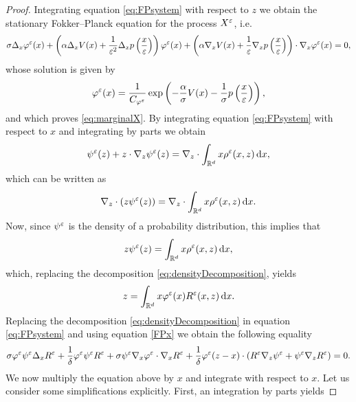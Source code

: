\documentclass[10pt]{article}
\begin{document}
\begin{proof} Integrating equation \eqref{eq:FPsystem} with respect to $z$ we obtain the stationary Fokker--Planck equation for the process $X^\varepsilon$, i.e.
\begin{equation}
\label{FPx}
\sigma \Delta_x \varphi^\varepsilon(x) + \left ( \alpha \Delta_x V(x) + \frac1{\varepsilon^2} \Delta_x p \left( \frac{x}{\varepsilon} \right) \right) \varphi^\varepsilon(x) + \left ( \alpha \nabla_xV(x) + \frac{1}{\varepsilon} \nabla_xp \left ( \frac{x}{\varepsilon} \right ) \right ) \cdot \nabla_x\varphi^\varepsilon(x) = 0,
\end{equation}
whose solution is given by
\begin{equation}
\varphi^\varepsilon(x) = \frac{1}{C_{\varphi^\varepsilon}} \exp\left(- \frac{\alpha}{\sigma} V(x) - \frac{1}{\sigma} p \left ( \frac{x}{\varepsilon} \right )\right),
\end{equation}
and which proves \eqref{eq:marginalX}. By integrating equation \eqref{eq:FPsystem} with respect to $x$ and integrating by parts we obtain
\begin{equation}
\psi^\varepsilon(z) + z \cdot \nabla_z \psi^\varepsilon(z) = \nabla_z \cdot \int_{\mathbb{R}^d} x \rho^\varepsilon(x,z) \,\mathrm{d} x,
\end{equation}
which can be written as
\begin{equation}
	\nabla_z \cdot (z \psi^\varepsilon(z)) = \nabla_z \cdot \int_{\mathbb{R}^d} x \rho^\varepsilon(x,z) \,\mathrm{d} x.
\end{equation}
Now, since $\psi^\varepsilon$ is the density of a probability distribution, this implies that 
\begin{equation}\label{FPz}
z \psi^\varepsilon(z) = \int_{\mathbb{R}^d} x \rho^\varepsilon(x,z) \,\mathrm{d} x,
\end{equation}
which, replacing the decomposition \eqref{eq:densityDecomposition}, yields
\begin{equation} \label{eq:z_condition}
z = \int_{\mathbb{R}^d} x \varphi^\varepsilon(x) R^\varepsilon(x,z) \,\mathrm{d} x.
\end{equation}
Replacing the decomposition \eqref{eq:densityDecomposition} in equation \eqref{eq:FPsystem} and using equation \eqref{FPx} we obtain the following equality
\begin{equation}\label{eq:psiEqualityPDE}
\sigma \varphi^\varepsilon \psi^\varepsilon \Delta_x R^\varepsilon + \frac{1}{\delta} \varphi^\varepsilon \psi^\varepsilon R^\varepsilon + \sigma \psi^\varepsilon \nabla_x\varphi^\varepsilon \cdot \nabla_x R^\varepsilon + \frac{1}{\delta} \varphi^\varepsilon  (z-x) \cdot (R^\varepsilon \nabla_z\psi^\varepsilon  + \psi^\varepsilon \nabla_z R^\varepsilon) = 0.
\end{equation}
We now multiply the equation above by $x$ and integrate with respect to $x$. Let us consider some simplifications explicitly. First, an integration by parts yields

\end{proof}
\end{document}
